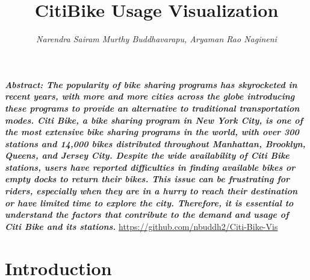 \documentclass[journal]{vgtc}                     %
\title{CitiBike Usage Visualization}
\author{%
  \textit{Narendra Sairam Murthy Buddhavarapu,
  Aryaman Rao Nagineni}
}
\begin{document}

\maketitle

 \textit{\textbf{ Abstract: The popularity of bike sharing programs has skyrocketed in recent years, with more and more cities across the globe introducing these programs to provide an alternative to traditional transportation modes. Citi Bike, a bike sharing program in New York City, is one of the most extensive bike sharing programs in the world, with over 300 stations and 14,000 bikes distributed throughout Manhattan, Brooklyn, Queens, and Jersey City.
Despite the wide availability of Citi Bike stations, users have reported difficulties in finding available bikes or empty docks to return their bikes. This issue can be frustrating for riders, especially when they are in a hurry to reach their destination or have limited time to explore the city. Therefore, it is essential to understand the factors that contribute to the demand and usage of Citi Bike and its stations.}} \href{https://github.com/nbuddh2/Citi-Bike-Vis}{https://github.com/nbuddh2/Citi-Bike-Vis}

\section{Introduction}
\end{document}
